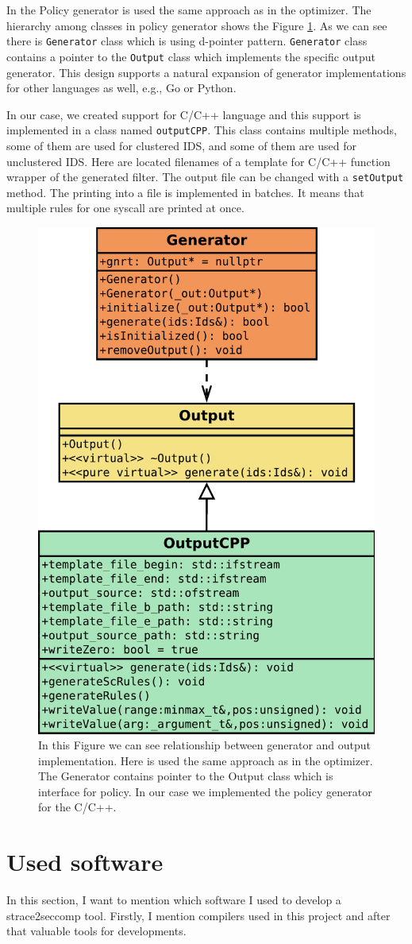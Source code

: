 In the Policy generator is used the same approach as in the optimizer. The
hierarchy among classes in policy generator shows the Figure
\ref{fig:class:output}. As we can see there is \texttt{Generator} class which is using
d-pointer pattern. \texttt{Generator} class contains a pointer to the \texttt{Output} class which
implements the specific output generator. This design supports a natural
expansion of generator implementations for other languages as well, e.g., Go or
Python.

In our case, we created support for C/C++ language and this support is
implemented in a class named \texttt{outputCPP}. This class contains multiple
methods, some of them are used for clustered IDS, and some of them are used for
unclustered IDS. Here are located filenames of a template for C/C++ function
wrapper of the generated filter. The output file can be changed with a
\texttt{setOutput} method. The printing into a file is implemented in batches.
It means that multiple rules for one syscall are printed at once.

\begin{figure}[H]
	\centering
	\includegraphics[width=0.45\linewidth]{obrazky-figures/class/output.pdf}
	\caption{In this Figure we can see relationship between generator and output
	implementation. Here is used the same approach as in the optimizer.
	The Generator contains pointer to the Output class which is interface for
	policy. In our case we implemented the policy generator for the C/C++.}
	\label{fig:class:output}
\end{figure}

\section{Used software}
In this section, I want to mention which software I used to develop a strace2seccomp tool.
Firstly, I mention compilers used in this project and after that valuable tools for developments.

